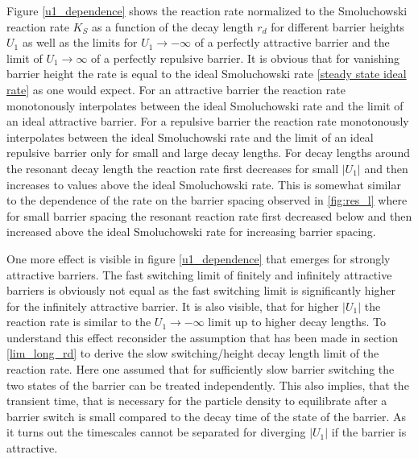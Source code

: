 Figure \ref{u1_dependence} shows the reaction rate normalized to the Smoluchowski reaction rate $K_S$ as a function of the decay length $r_d$ for different barrier heights $U_1$ as well as the limits for $U_1 \rightarrow -\infty$ of a perfectly attractive barrier and the limit of $U_1 \rightarrow \infty$ of a perfectly repulsive barrier.
It is obvious that for vanishing barrier height the rate is equal to the ideal Smoluchowski rate \eqref{steady state ideal rate} as one would expect. For an attractive barrier the reaction rate monotonously interpolates between the ideal Smoluchowski rate and the limit of an ideal attractive barrier. For a repulsive barrier the reaction rate monotonously interpolates between the ideal Smoluchowski rate and the limit of an ideal repulsive barrier only for small and large decay lengths. For decay lengths around the resonant decay length the reaction rate first decreases for small $|U_1|$ and then increases to values above the ideal Smoluchowski rate. This is somewhat similar to the dependence of the rate on the barrier spacing observed in \ref{fig:res_l} where for small barrier spacing the resonant reaction rate first decreased below and then increased above the ideal Smoluchowski rate for increasing barrier spacing. \par
One more effect is visible in figure \ref{u1_dependence} that emerges for strongly attractive barriers. The fast switching limit of finitely and infinitely attractive barriers is obviously not equal as the fast switching limit is significantly higher for the infinitely attractive barrier. It is also visible, that for higher $|U_1|$ the reaction rate is similar to the $U_1 \rightarrow -\infty$ limit up to higher decay lengths. To understand this effect reconsider the assumption that has been made in section \ref{lim_long_rd} to derive the slow switching/height decay length limit of the reaction rate. Here one assumed that for sufficiently slow barrier switching the two states of the barrier can be treated independently. This also implies, that the transient time, that is necessary for the particle density to equilibrate after a barrier switch is small compared to the decay time of the state of the barrier. As it turns out the timescales cannot be separated for diverging $|U_1|$ if the barrier is attractive.\\

